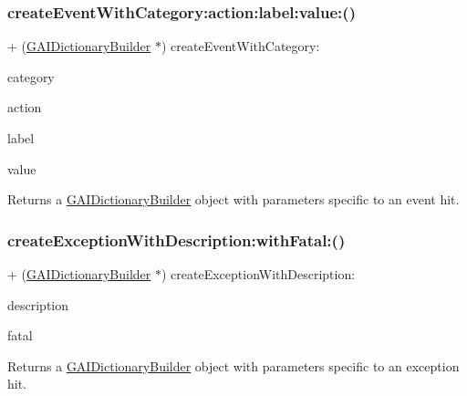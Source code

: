 \subsubsection{\texorpdfstring{create\+Event\+With\+Category\+:action\+:label\+:value\+:()}{createEventWithCategory:action:label:value:()}}
{\footnotesize\ttfamily + (\hyperlink{interface_g_a_i_dictionary_builder}{G\+A\+I\+Dictionary\+Builder} $\ast$) create\+Event\+With\+Category\+: \begin{DoxyParamCaption}\item[{(N\+S\+String $\ast$)}]{category }\item[{action:(N\+S\+String $\ast$)}]{action }\item[{label:(N\+S\+String $\ast$)}]{label }\item[{value:(N\+S\+Number $\ast$)}]{value }\end{DoxyParamCaption}}

Returns a \hyperlink{interface_g_a_i_dictionary_builder}{G\+A\+I\+Dictionary\+Builder} object with parameters specific to an event hit. \mbox{\label{interface_g_a_i_dictionary_builder_a1fb6d157f764b043b259a7aa2b6b165e}} 
\subsubsection{\texorpdfstring{create\+Exception\+With\+Description\+:with\+Fatal\+:()}{createExceptionWithDescription:withFatal:()}}
{\footnotesize\ttfamily + (\hyperlink{interface_g_a_i_dictionary_builder}{G\+A\+I\+Dictionary\+Builder} $\ast$) create\+Exception\+With\+Description\+: \begin{DoxyParamCaption}\item[{(N\+S\+String $\ast$)}]{description }\item[{withFatal:(N\+S\+Number $\ast$)}]{fatal }\end{DoxyParamCaption}}

Returns a \hyperlink{interface_g_a_i_dictionary_builder}{G\+A\+I\+Dictionary\+Builder} object with parameters specific to an exception hit. \mbox{\label{interface_g_a_i_dictionary_builder_a0bb8a0966728ce99b5281281a349e61f}} 
